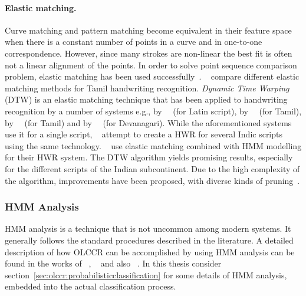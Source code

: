 \paragraph{Elastic matching.}
Curve matching and pattern matching become equivalent in their feature space
when there is a constant number of points in a curve and in one-to-one 
correspondence. However, since many strokes are non-linear the best fit is often
not a linear alignment of the points.
In order to solve point sequence comparison problem, elastic matching has 
been used successfully~.
~\citeyear{Joshi2004a} compare different elastic matching methods for Tamil 
handwriting recognition. \emph{Dynamic Time Warping} (DTW) is an elastic 
matching technique that has been applied to handwriting recognition by a number 
of systems e.g., by~~\citeyear{Vuori2001} (for Latin script), 
by~~\citeyear{Niels2004} (for Tamil), 
by~~\citeyear{Joshi2004b} (for Tamil) and 
by~~\citeyear{Joshi2005} (for Devanagari). 
While the aforementioned systems use it for a single script, 
~\citeyear{Bharath2009} attempt to create a HWR for several 
Indic scripts using the same technology. 
~\citeyear{BahlmannBurkhardt2004} use elastic 
matching combined with HMM modelling for their HWR system. 
The DTW algorithm yields promising results, 
especially for the different scripts of the Indian subcontinent.
Due to the high complexity of the algorithm, improvements have been proposed,
with diverse kinds of pruning~.

\subsubsection{HMM Analysis}
\label{sec:hmmanalysis}

HMM analysis is a technique that is not uncommon among modern systems.
It generally follows the standard procedures described in the literature.
A detailed description of how OLCCR can be
accomplished by using HMM analysis can be found in the works of 
~\citeyear{Hu1996},
~\citeyear{Hu2000} and also 
~\citeyear{BahlmannBurkhardt2004}.
In this thesis consider section~\ref{sec:olccr:probabilisticclassification} for
some details of HMM analysis, embedded into the actual classification process.


